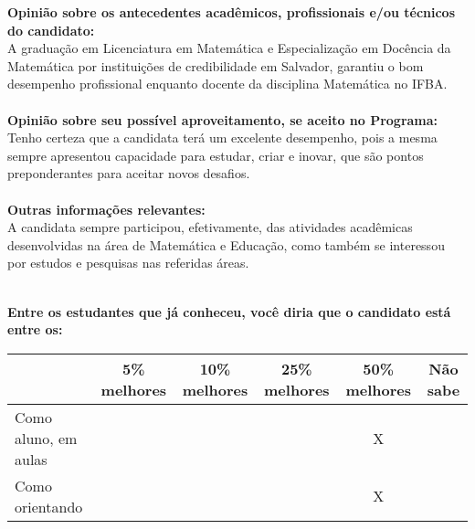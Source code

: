 \documentclass[11pt]{article}
\begin{document}
\textbf{Opinião sobre os antecedentes acadêmicos, profissionais e/ou técnicos do candidato:}
\\A graduação em Licenciatura em Matemática e Especialização em Docência da Matemática por instituições de credibilidade em Salvador, garantiu o bom desempenho profissional enquanto docente da disciplina Matemática no IFBA.\\
\\
\textbf{Opinião sobre seu possível aproveitamento, se aceito no Programa:}
\\Tenho certeza que a candidata terá um excelente desempenho, pois a mesma sempre apresentou capacidade para estudar, criar e inovar,  que são pontos preponderantes para aceitar novos desafios.\\ 
\\
\textbf{Outras informações relevantes:} \\A candidata sempre participou, efetivamente, das atividades acadêmicas desenvolvidas na área de Matemática e Educação, como também se interessou por estudos e pesquisas nas referidas áreas.


\\[0.3cm]
\textbf{Entre os estudantes que já conheceu, você diria que o candidato está entre os:}
\\
\begin{tabular}{|l|c|c|c|c|c|}
\hline
 & 5\% melhores & 10\% melhores & 25\% melhores & 50\% melhores & Não sabe \\
\hline
Como aluno, em aulas &  &  &  & X & \\
\hline
Como orientando &  &  &  & X & \\
\hline
\end{tabular}
\end{document}
